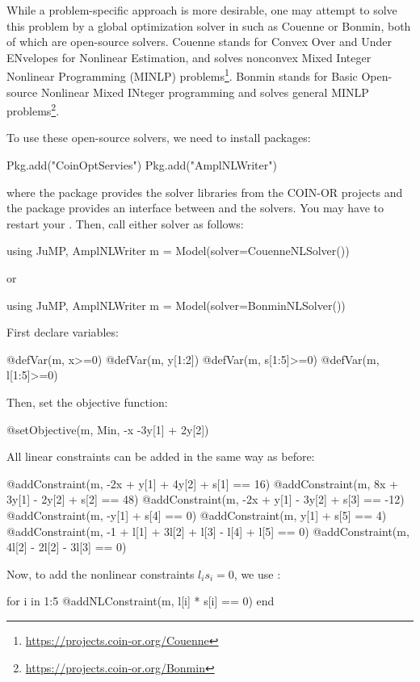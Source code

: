 While a problem-specific approach is more desirable, one may attempt to solve this problem by a global optimization solver in \julia{} such as Couenne or Bonmin, both of which are open-source solvers. Couenne stands for Convex Over and Under ENvelopes for Nonlinear Estimation, and solves nonconvex Mixed Integer Nonlinear Programming (MINLP) problems\footnote{\url{https://projects.coin-or.org/Couenne}}. Bonmin stands for Basic Open-source Nonlinear Mixed INteger programming and solves general MINLP problems\footnote{\url{https://projects.coin-or.org/Bonmin}}.

To use these open-source solvers, we need to install packages:
\begin{code}
Pkg.add("CoinOptServies")
Pkg.add("AmplNLWriter")
\end{code}
\noindent where the  package provides the solver libraries from the COIN-OR projects and the  package provides an interface between \jump{} and the solvers. You may have to restart your \julia{}. Then, call either solver as follows:
\begin{code}
using JuMP, AmplNLWriter
m = Model(solver=CouenneNLSolver())
\end{code}
\noindent or
\begin{code}
using JuMP, AmplNLWriter
m = Model(solver=BonminNLSolver())
\end{code}

First declare variables:
\begin{code}
@defVar(m, x>=0)
@defVar(m, y[1:2])
@defVar(m, s[1:5]>=0)
@defVar(m, l[1:5]>=0)
\end{code}
\noindent Then, set the objective function:
\begin{code}
@setObjective(m, Min, -x -3y[1] + 2y[2])
\end{code}
\noindent All linear constraints can be added in the same way as before:
\begin{code}
@addConstraint(m, -2x +  y[1] + 4y[2] + s[1] ==  16)
@addConstraint(m,  8x + 3y[1] - 2y[2] + s[2] ==  48)
@addConstraint(m, -2x +  y[1] - 3y[2] + s[3] == -12)
@addConstraint(m,       -y[1]         + s[4] ==   0)
@addConstraint(m,        y[1]         + s[5] ==   4)
@addConstraint(m, -1 + l[1] + 3l[2] +  l[3] - l[4] + l[5] == 0)
@addConstraint(m,     4l[2] - 2l[2] - 3l[3]               == 0)
\end{code}

Now, to add the nonlinear constraints $l_i s_i = 0$, we use :
\begin{code}
for i in 1:5
    @addNLConstraint(m, l[i] * s[i] == 0)
end
\end{code}


